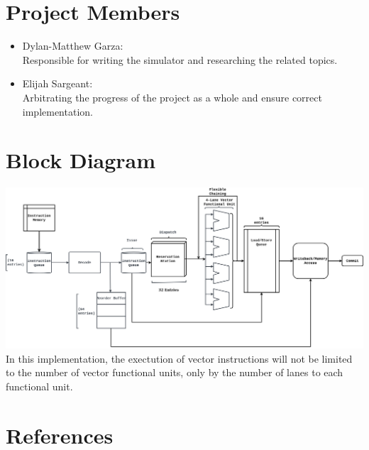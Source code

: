 \documentclass[12pt]{article}
\begin{document}
\section{Project Members}
\begin{itemize}
    \item Dylan-Matthew Garza:\\
        Responsible for writing the simulator and researching the related
        topics.
    \item Elijah Sargeant:\\
        Arbitrating the progress of the project as a whole and ensure correct
        implementation.
\end{itemize}
\break
\section{Block Diagram}
\includegraphics[scale=0.275]{diagram.png}
In this implementation, the exectution of vector instructions will not be limited
to the number of vector functional units, only by the number of lanes to each functional
unit.
\pagebreak
\section{References}
\end{document}
